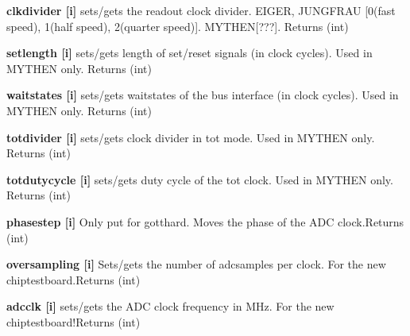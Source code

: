 \begin{DoxyItemize}
\item {\bfseries clkdivider \mbox{[}i\mbox{]}} sets/gets the readout clock divider. EIGER, JUNGFRAU \mbox{[}0(fast speed), 1(half speed), 2(quarter speed)\mbox{]}. MYTHEN\mbox{[}???\mbox{]}. {\ttfamily Returns} {\ttfamily }(int)
\end{DoxyItemize}


\begin{DoxyItemize}
\item {\bfseries setlength \mbox{[}i\mbox{]}} sets/gets length of set/reset signals (in clock cycles). Used in MYTHEN only. {\ttfamily Returns} {\ttfamily }(int)
\end{DoxyItemize}


\begin{DoxyItemize}
\item {\bfseries waitstates \mbox{[}i\mbox{]}} sets/gets waitstates of the bus interface (in clock cycles). Used in MYTHEN only. {\ttfamily Returns} {\ttfamily }(int)
\end{DoxyItemize}


\begin{DoxyItemize}
\item {\bfseries totdivider \mbox{[}i\mbox{]}} sets/gets clock divider in tot mode. Used in MYTHEN only. {\ttfamily Returns} {\ttfamily }(int)
\end{DoxyItemize}


\begin{DoxyItemize}
\item {\bfseries totdutycycle \mbox{[}i\mbox{]}} sets/gets duty cycle of the tot clock. Used in MYTHEN only. {\ttfamily Returns} {\ttfamily }(int)
\end{DoxyItemize}


\begin{DoxyItemize}
\item {\bfseries phasestep \mbox{[}i\mbox{]}} Only put for gotthard. Moves the phase of the ADC clock.{\ttfamily Returns} {\ttfamily }(int)
\end{DoxyItemize}


\begin{DoxyItemize}
\item {\bfseries oversampling \mbox{[}i\mbox{]}} Sets/gets the number of adcsamples per clock. For the new chiptestboard.{\ttfamily Returns} {\ttfamily }(int)
\end{DoxyItemize}


\begin{DoxyItemize}
\item {\bfseries adcclk \mbox{[}i\mbox{]}} sets/gets the ADC clock frequency in MHz. For the new chiptestboard!{\ttfamily Returns} {\ttfamily }(int)
\end{DoxyItemize}


